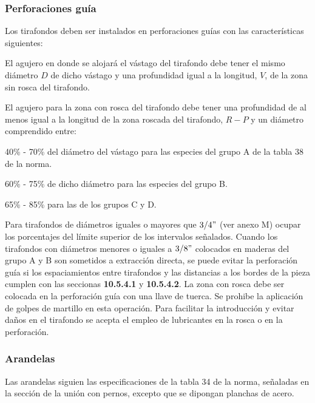 \subsubsection{Perforaciones guía}
Los tirafondos deben ser instalados en perforaciones guías con las características siguientes:
\begin{itemize*}
	\item El agujero en donde se alojará el vástago del tirafondo debe tener el mismo diámetro $D$ de dicho vástago y una profundidad igual a la longitud, $V$, de la zona sin rosca del tirafondo.
	\item El agujero para la zona con rosca del tirafondo debe tener una profundidad de al menos igual a la longitud de la zona roscada del tirafondo, $R-P$ y un diámetro comprendido entre:
	\begin{itemize*}
		\item 40\% - 70\% del diámetro del vástago para las especies del grupo A de la tabla 38 de la norma.
		\item 60\% - 75\% de dicho diámetro para las especies del grupo B.
		\item 65\% - 85\% para las de los grupos C y D.
	\end{itemize*}
\end{itemize*}
Para tirafondos de diámetros iguales o mayores que $3/4"$ (ver anexo M) ocupar los porcentajes del límite superior de los intervalos señalados. Cuando los tirafondos con diámetros menores o iguales a $3/8"$ colocados en maderas del grupo A y B son sometidos a extracción directa, se puede evitar la perforación guía si los espaciamientos entre tirafondos y las distancias a los bordes de la pieza cumplen con las seccionas \textbf{10.5.4.1} y \textbf{10.5.4.2}.
La zona con rosca debe ser colocada en la perforación guía con una llave de tuerca. Se prohibe la aplicación de golpes de martillo en esta operación. Para facilitar la introducción y evitar daños en el tirafondo se acepta el empleo de lubricantes en la rosca o en la perforación.

\subsubsection{Arandelas}
Las arandelas siguien las especificaciones de la tabla 34 de la norma, señaladas en la sección de la unión con pernos, excepto que se dipongan planchas de acero.

